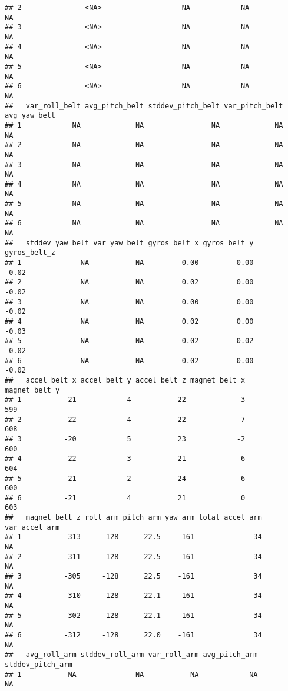 \documentclass[
]{article}
\begin{document}
\begin{verbatim}
## 2               <NA>                   NA            NA               NA
## 3               <NA>                   NA            NA               NA
## 4               <NA>                   NA            NA               NA
## 5               <NA>                   NA            NA               NA
## 6               <NA>                   NA            NA               NA
##   var_roll_belt avg_pitch_belt stddev_pitch_belt var_pitch_belt avg_yaw_belt
## 1            NA             NA                NA             NA           NA
## 2            NA             NA                NA             NA           NA
## 3            NA             NA                NA             NA           NA
## 4            NA             NA                NA             NA           NA
## 5            NA             NA                NA             NA           NA
## 6            NA             NA                NA             NA           NA
##   stddev_yaw_belt var_yaw_belt gyros_belt_x gyros_belt_y gyros_belt_z
## 1              NA           NA         0.00         0.00        -0.02
## 2              NA           NA         0.02         0.00        -0.02
## 3              NA           NA         0.00         0.00        -0.02
## 4              NA           NA         0.02         0.00        -0.03
## 5              NA           NA         0.02         0.02        -0.02
## 6              NA           NA         0.02         0.00        -0.02
##   accel_belt_x accel_belt_y accel_belt_z magnet_belt_x magnet_belt_y
## 1          -21            4           22            -3           599
## 2          -22            4           22            -7           608
## 3          -20            5           23            -2           600
## 4          -22            3           21            -6           604
## 5          -21            2           24            -6           600
## 6          -21            4           21             0           603
##   magnet_belt_z roll_arm pitch_arm yaw_arm total_accel_arm var_accel_arm
## 1          -313     -128      22.5    -161              34            NA
## 2          -311     -128      22.5    -161              34            NA
## 3          -305     -128      22.5    -161              34            NA
## 4          -310     -128      22.1    -161              34            NA
## 5          -302     -128      22.1    -161              34            NA
## 6          -312     -128      22.0    -161              34            NA
##   avg_roll_arm stddev_roll_arm var_roll_arm avg_pitch_arm stddev_pitch_arm
## 1           NA              NA           NA            NA               NA

\end{verbatim}
\end{document}
